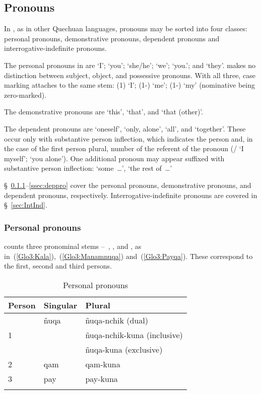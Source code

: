 \subsection{Pronouns}
In \SYQ, as in other Quechuan languages, pronouns may be sorted into four classes: personal pronouns, demonstrative pronouns, dependent pronouns and interroga\-tive-indefinite pronouns.

The personal pronouns in \SYQ{} are  ‘I’;  ‘you’;  ‘she/he’;  ‘we’;  ‘you.’; and  ‘they’. \SYQ{} makes no distinction between subject, object, and possessive pronouns. With all three, case marking attaches to the same stem:  (1) ‘I’;  (1-) ‘me’;  (1-) ‘my’ (nominative being zero-marked).

The demonstrative pronouns are  ‘this’,  ‘that’, and  ‘that (other)’.

The dependent pronouns are  ‘oneself’,  ‘only, alone’,  ‘all’, and  ‘together’. These occur only with substantive person inflection, which indicates the person and, in the case of the first person plural, number of the referent of the pronoun (/\phono{-:} ‘I myself’;  ‘you alone’). One additional pronoun may appear suffixed with substantive person inflection:  ‘some~\dots’, ‘the rest of~\dots’

§~\ref{ssec:ppnqp}--\ref{ssec:deppro} cover the personal pronouns, demonstrative pronouns, and dependent pronouns, respectively. Interrogative-indefinite pronouns are covered in §~\ref{sec:IntInd}.

\subsubsection{Personal pronouns }\label{ssec:ppnqp}
\SYQ{} counts three pronominal stems --~, , and , as in~(\ref{Glo3:Kala}),~(\ref{Glo3:Manamnuqa}) and~(\ref{Glo3:Payqa}). These correspond to the first, second and third persons.

\begin{table}[!ht]
\small\centering
\caption{Personal pronouns}\label{Tab8}
\begin{tabular}{lll}
\lsptoprule
Person & Singular & Plural\\
\midrule
\multirow{3}{*}{1} 	& ñuqa 	& ñuqa-nchik (dual)		\\
	& 			& ñuqa-nchik-kuna (inclusive)	\\
	& 			& ñuqa-kuna (exclusive)	\\
2 	& qam 		& qam-kuna			\\
3 	& pay 		& pay-kuna\\
\lspbottomrule
\end{tabular}
\end{table}

